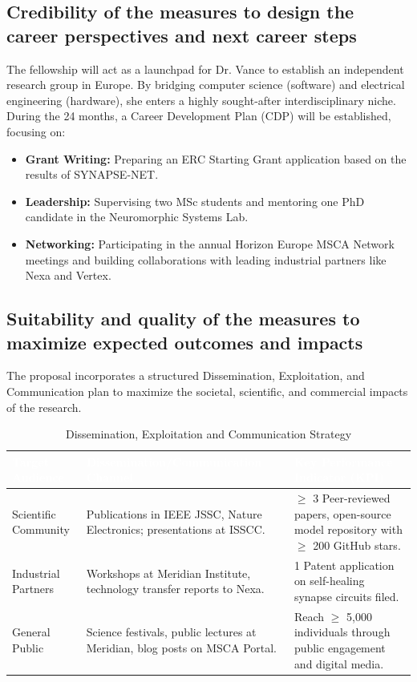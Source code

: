 \documentclass[11pt,a4paper]{article}
\begin{document}
\subsection{Credibility of the measures to design the career perspectives and next career steps}
The fellowship will act as a launchpad for Dr. Vance to establish an independent research group in Europe. By bridging computer science (software) and electrical engineering (hardware), she enters a highly sought-after interdisciplinary niche. During the 24 months, a Career Development Plan (CDP) will be established, focusing on:
\begin{itemize}[leftmargin=*]
  \item \textbf{Grant Writing:} Preparing an ERC Starting Grant application based on the results of SYNAPSE-NET.
  \item \textbf{Leadership:} Supervising two MSc students and mentoring one PhD candidate in the Neuromorphic Systems Lab.
  \item \textbf{Networking:} Participating in the annual Horizon Europe MSCA Network meetings and building collaborations with leading industrial partners like Nexa and Vertex.
\end{itemize}

\subsection{Suitability and quality of the measures to maximize expected outcomes and impacts}
The proposal incorporates a structured Dissemination, Exploitation, and Communication plan to maximize the societal, scientific, and commercial impacts of the research.

\begin{table}[h]
\centering
\caption{Dissemination, Exploitation and Communication Strategy}
\label{tab:dissemination}
\vspace{0.2cm}
\begin{tabularx}{\textwidth}{lXX}
  \toprule
  \rowcolor{MSCABlue} \textcolor{white}{\textbf{Target Audience}} & \textcolor{white}{\textbf{Dissemination/Communication Channel}} & \textcolor{white}{\textbf{Key Performance Indicator (KPI)}} \\ \midrule
  Scientific Community & Publications in IEEE JSSC, Nature Electronics; presentations at ISSCC. & $\ge$ 3 Peer-reviewed papers, open-source model repository with $\ge$ 200 GitHub stars. \\
  Industrial Partners & Workshops at Meridian Institute, technology transfer reports to Nexa. & 1 Patent application on self-healing synapse circuits filed. \\
  General Public & Science festivals, public lectures at Meridian, blog posts on MSCA Portal. & Reach $\ge$ 5,000 individuals through public engagement and digital media. \\ \bottomrule
\end{tabularx}
\end{table}
\end{document}

